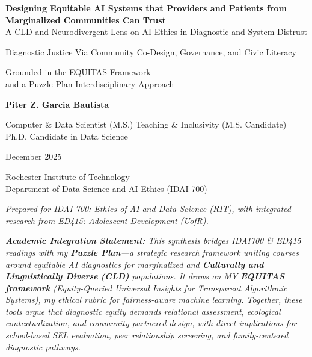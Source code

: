 \documentclass[12pt,a4paper]{article}
\begin{document}
\begin{titlepage}
\centering
\vspace*{2.5cm}


{\Large \textbf{Designing Equitable AI Systems that Providers and Patients from Marginalized Communities Can Trust}}\\
{\normalsize A CLD and Neurodivergent Lens on AI Ethics in Diagnostic and System Distrust}


\vspace{1.6cm}

{\large Diagnostic Justice Via Community Co-Design, Governance, and Civic Literacy}

\vspace{1.6cm}


{\normalsize Grounded in the EQUITAS Framework \\ and a Puzzle Plan Interdisciplinary Approach}


\vspace{2.4cm}


{\large \textbf{Piter Z. Garcia Bautista} \par}
{\large Computer \& Data Scientist (M.S.) \textbullet{} Teaching \& Inclusivity (M.S. Candidate) \textbullet{} Ph.D. Candidate in Data Science}


\vspace{0.3cm}


{\normalsize December 2025}


\vspace{2.5cm}


{\small Rochester Institute of Technology \\ Department of Data Science and AI Ethics (IDAI-700)}


\vfill

{
\scriptsize \textit{Prepared for IDAI-700: Ethics of AI and Data Science (RIT), with integrated research from ED415: Adolescent Development (UofR).} \\

\vspace{0.3cm}

\textit{\tiny\textbf{Academic Integration Statement:} This synthesis bridges IDAI700 \& ED415 readings with my \textbf{Puzzle Plan}—a strategic research framework uniting courses around equitable AI diagnostics for marginalized and \textbf{\textit{Culturally and Linguistically Diverse}} \textbf{(CLD)} populations. It draws on MY \textbf{EQUITAS framework} \textit{(Equity-Queried Universal Insights for Transparent Algorithmic Systems)}, my ethical rubric for fairness-aware machine learning. Together, these tools argue that \emph{diagnostic equity demands relational assessment, ecological contextualization, and community-partnered design}, with direct implications for school-based SEL evaluation, peer relationship screening, and family-centered diagnostic pathways.}

}

\end{titlepage}
\end{document}
